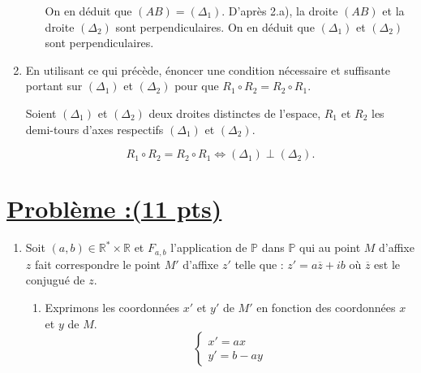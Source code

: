 \documentclass[12pt,a4paper]{article}
\begin{document}
\begin{enumerate}
\begin{enumerate}
			On en déduit que $(AB) = (\Delta_1)$. D’après 2.a), la droite $(AB)$ et la droite $(\Delta_2)$ sont perpendiculaires. On en déduit que $(\Delta_1)$ et $(\Delta_2)$ sont perpendiculaires.
		\end{enumerate}
\item En utilisant ce qui précède, énoncer une condition nécessaire et suffisante portant sur $(\Delta_1)$ et $(\Delta_2)$ pour que $R_1 \circ R_2 = R_2 \circ R_1$.

Soient $(\Delta_1)$ et $(\Delta_2)$ deux droites distinctes de l’espace, $R_1$ et $R_2$ les demi-tours d’axes respectifs $(\Delta_1)$ et $(\Delta_2)$.

\[ R_1 \circ R_2 = R_2 \circ R_1 \iff (\Delta_1) \perp (\Delta_2). \]
\end{enumerate}

\section*{\underline{Problème :(11 pts)}}
\begin{enumerate}
\item Soit $(a, b) \in \mathbb{R}^* \times \mathbb{R}$ et $F_{a,b}$ l’application de $\mathbb{P}$ dans $\mathbb{P}$ qui au point $M$ d’affixe $z$ fait correspondre le point $M'$ d’affixe $z'$ telle que : $z' = a \overline{z} + ib$ où $\overline{z}$ est le conjugué de $z$.
\begin{enumerate}
\item Exprimons les coordonnées $x'$ et $y'$ de $M'$ en fonction des coordonnées $x$ et $y$ de $M$.
\[
\begin{cases}
x' = a x \\
y' = b - a y
\end{cases}
\]
\end{enumerate}
\end{enumerate}
\end{document}
